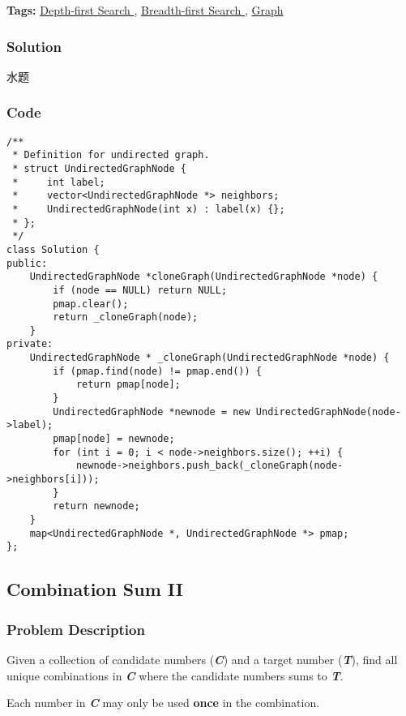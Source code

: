 \documentclass{article}
\begin{document}
\begin{CJK*}{UTF8}{gkai}
\textbf{Tags: }
\hyperref[ Depth-first Search ]{ Depth-first Search },  \hyperref[ Breadth-first Search ]{ Breadth-first Search },  \hyperref[ Graph ]{ Graph }



\subsubsection*{Solution}
水题

\subsubsection*{Code}
\begin{lstlisting}
/**
 * Definition for undirected graph.
 * struct UndirectedGraphNode {
 *     int label;
 *     vector<UndirectedGraphNode *> neighbors;
 *     UndirectedGraphNode(int x) : label(x) {};
 * };
 */
class Solution {
public:
    UndirectedGraphNode *cloneGraph(UndirectedGraphNode *node) {
        if (node == NULL) return NULL;
        pmap.clear();
        return _cloneGraph(node);
    }
private:
    UndirectedGraphNode * _cloneGraph(UndirectedGraphNode *node) {
        if (pmap.find(node) != pmap.end()) {
            return pmap[node];
        }
        UndirectedGraphNode *newnode = new UndirectedGraphNode(node->label);
        pmap[node] = newnode;
        for (int i = 0; i < node->neighbors.size(); ++i) {
            newnode->neighbors.push_back(_cloneGraph(node->neighbors[i]));
        }
        return newnode;
    }
    map<UndirectedGraphNode *, UndirectedGraphNode *> pmap;
}; 
\end{lstlisting}


\subsection{ Combination Sum II }
\label{ Combination Sum II }

\subsubsection*{Problem Description}
Given a collection of candidate numbers (\textbf{\emph{C}}) and a target number (\textbf{\emph{T}}), find all unique combinations in \textbf{\emph{C}} where the candidate numbers sums to \textbf{\emph{T}}.

Each number in \textbf{\emph{C}} may only be used \textbf{once} in the combination.


\end{CJK*}
\end{document}
